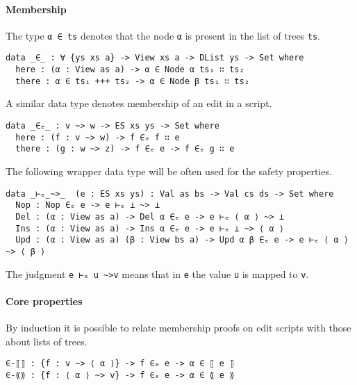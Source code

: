 \documentclass[../Thesis.tex]{subfiles}
\begin{document}
	\paragraph{Membership}
	\label{par:membership}
	The type \texttt{α ∈ ts} denotes that the node \texttt{α} is present
	in the list of trees \texttt{ts}.

\begin{verbatim}
data _∈_ : ∀ {ys xs a} -> View xs a -> DList ys -> Set where
  here : (α : View as a) -> α ∈ Node α ts₁ ∷ ts₂
  there : α ∈ ts₁ +++ ts₂ -> α ∈ Node β ts₁ ∷ ts₂
\end{verbatim}

A similar data type denotes membership of an edit in a script.

\begin{verbatim}
data _∈ₑ_ : v ~> w -> ES xs ys -> Set where
  here : (f : v ~> w) -> f ∈ₑ f ∷ e
  there : (g : w ~> z) -> f ∈ₑ e -> f ∈ₑ g ∷ e
\end{verbatim}
	
	The following wrapper data type will be often used for the safety properties.

\begin{verbatim}
data _⊢ₑ_~>_  (e : ES xs ys) : Val as bs -> Val cs ds -> Set where
  Nop : Nop ∈ₑ e -> e ⊢ₑ ⊥ ~> ⊥
  Del : (α : View as a) -> Del α ∈ₑ e -> e ⊢ₑ ⟨ α ⟩ ~> ⊥
  Ins : (α : View as a) -> Ins α ∈ₑ e -> e ⊢ₑ ⊥ ~> ⟨ α ⟩
  Upd : (α : View as a) (β : View bs a) -> Upd α β ∈ₑ e -> e ⊢ₑ ⟨ α ⟩ ~> ⟨ β ⟩ 
\end{verbatim}

	The judgment \texttt{e ⊢ₑ u \textasciitilde>v} means that in \texttt{e} the 
	value \texttt{u} is mapped to \texttt{v}. 
	
	
	\paragraph{Core properties}
	By induction it is possible to relate membership proofs on edit scripts
	with those about lists of trees.
	
\begin{verbatim}
∈-⟦⟧ : {f : v ~> ⟨ α ⟩} -> f ∈ₑ e -> α ∈ ⟦ e ⟧ 
∈-⟪⟫ : {f : ⟨ α ⟩ ~> v} -> f ∈ₑ e -> α ∈ ⟪ e ⟫
\end{verbatim}
\end{document}
